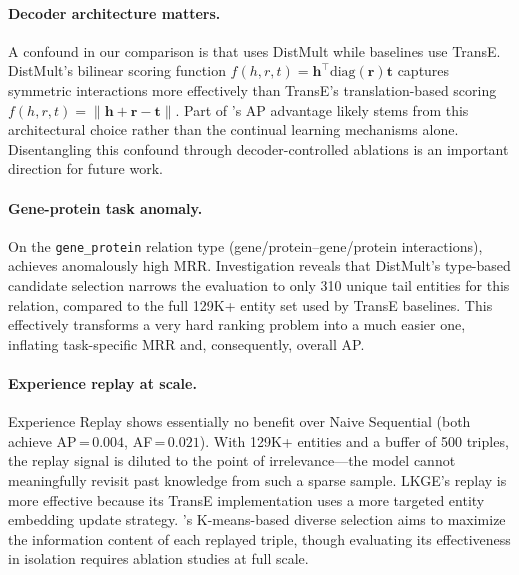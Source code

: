 \paragraph{Decoder architecture matters.}
A confound in our comparison is that \ours uses DistMult while baselines use TransE.
DistMult's bilinear scoring function $f(h, r, t) = \mathbf{h}^\top \text{diag}(\mathbf{r}) \mathbf{t}$ captures symmetric interactions more effectively than TransE's translation-based scoring $f(h, r, t) = \|\mathbf{h} + \mathbf{r} - \mathbf{t}\|$.
Part of \ours's AP advantage likely stems from this architectural choice rather than the continual learning mechanisms alone.
Disentangling this confound through decoder-controlled ablations is an important direction for future work.

\paragraph{Gene-protein task anomaly.}
On the \texttt{gene\_protein} relation type (gene/protein--gene/protein interactions), \ours achieves anomalously high MRR.
Investigation reveals that DistMult's type-based candidate selection narrows the evaluation to only 310 unique tail entities for this relation, compared to the full 129K+ entity set used by TransE baselines.
This effectively transforms a very hard ranking problem into a much easier one, inflating task-specific MRR and, consequently, overall AP.

\paragraph{Experience replay at scale.}
Experience Replay shows essentially no benefit over Naive Sequential (both achieve AP\,=\,$0.004$, AF\,=\,$0.021$).
With 129K+ entities and a buffer of 500 triples, the replay signal is diluted to the point of irrelevance---the model cannot meaningfully revisit past knowledge from such a sparse sample.
LKGE's replay is more effective because its TransE implementation uses a more targeted entity embedding update strategy.
\ours's K-means-based diverse selection aims to maximize the information content of each replayed triple, though evaluating its effectiveness in isolation requires ablation studies at full scale.
